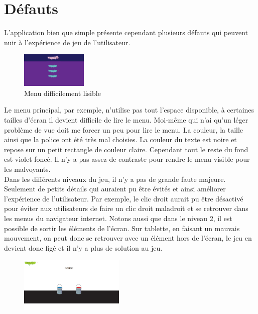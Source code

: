 \documentclass{article}
\begin{document}
\section{Défauts}

L'application bien que simple présente cependant plusieurs défauts qui peuvent nuir à l'expérience de jeu de l'utilisateur.

\begin{figure}
  \vspace{-20pt}
  \begin{center}
    \includegraphics[width=0.28\textwidth]{2}
  \end{center}
  \vspace{-20pt}
  \caption{Menu difficilement lisible}
  \vspace{-10pt}
\end{figure}

Le menu principal, par exemple, n'utilise pas tout l'espace disponible, à certaines tailles d'écran il devient difficile de lire le menu. Moi-même qui n'ai qu'un léger problème de vue doit me forcer un peu pour lire le menu. La couleur, la taille ainsi que la police ont été très mal choisies. La couleur du texte est noire et repose sur un petit rectangle de couleur claire. Cependant tout le reste du fond est violet foncé. Il n'y a pas assez de contraste pour rendre le menu visible pour les malvoyants.\hfill\\

Dans les différents niveaux du jeu, il n'y a pas de grande faute majeure. Seulement de petits détails qui auraient pu être évités et ainsi améliorer l'expérience de l'utilisateur. Par exemple, le clic droit aurait pu être désactivé pour éviter aux utilisateurs de faire un clic droit maladroit et se retrouver dans les menus du navigateur internet. Notons aussi que dans le niveau 2, il est possible de sortir les éléments de l'écran. Sur tablette, en faisant un mauvais mouvement, on peut donc se retrouver avec un élément hors de l'écran, le jeu en devient donc figé et il n'y a plus de solution au jeu.\\

\begin{figure}
\vspace{6pt}
\centering
\includegraphics[width=5cm]{6}
\end{figure}
\end{document}
